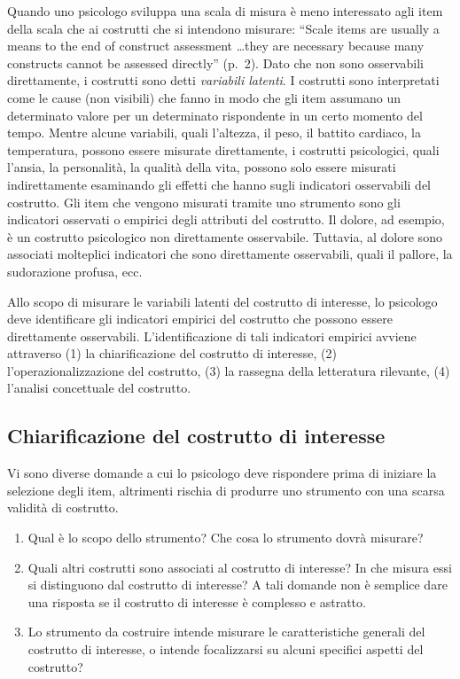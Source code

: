 \documentclass[
  11pt,
]{krantz}
\providecommand{\tightlist}{%
  \setlength{\itemsep}{0pt}\setlength{\parskip}{0pt}}
\theoremstyle{definition}
\theoremstyle{definition}
\theoremstyle{definition}
\theoremstyle{definition}
\theoremstyle{remark}
\begin{document}
Quando uno psicologo sviluppa una scala di misura è meno interessato agli item della scala che ai costrutti che si intendono misurare: ``Scale items are usually a means to the end of construct assessment \ldots they are necessary because many constructs cannot be assessed directly'' (p.~2). Dato che non sono osservabili direttamente, i costrutti sono detti \emph{variabili latenti}. I costrutti sono interpretati come le cause (non visibili) che fanno in modo che gli item assumano un determinato valore per un determinato rispondente in un certo momento del tempo. Mentre alcune variabili, quali l'altezza, il peso, il battito cardiaco, la temperatura, possono essere misurate direttamente, i costrutti psicologici, quali l'ansia, la personalità, la qualità della vita, possono solo essere misurati indirettamente esaminando gli effetti che hanno sugli indicatori osservabili del costrutto. Gli item che vengono misurati tramite uno strumento sono gli indicatori osservati o empirici degli attributi del costrutto. Il dolore, ad esempio, è un costrutto psicologico non direttamente osservabile. Tuttavia, al dolore sono associati molteplici indicatori che sono direttamente osservabili, quali il pallore, la sudorazione profusa, ecc.

Allo scopo di misurare le variabili latenti del costrutto di interesse, lo psicologo deve identificare gli indicatori empirici del costrutto che possono essere direttamente osservabili. L'identificazione di tali indicatori empirici avviene attraverso (1) la chiarificazione del costrutto di interesse, (2) l'operazionalizzazione del costrutto, (3) la rassegna della letteratura rilevante, (4) l'analisi concettuale del costrutto.

\hypertarget{chiarificazione-del-costrutto-di-interesse}{%
\subsection{Chiarificazione del costrutto di interesse}\label{chiarificazione-del-costrutto-di-interesse}}

Vi sono diverse domande a cui lo psicologo deve rispondere prima di iniziare la selezione degli item, altrimenti rischia di produrre uno strumento con una scarsa validità di costrutto.

\begin{enumerate}
\def\labelenumi{\arabic{enumi}.}
\tightlist
\item
  Qual è lo scopo dello strumento? Che cosa lo strumento dovrà misurare?
\item
  Quali altri costrutti sono associati al costrutto di interesse? In che misura essi si distinguono dal costrutto di interesse? A tali domande non è semplice dare una risposta se il costrutto di interesse è complesso e astratto.
\item
  Lo strumento da costruire intende misurare le caratteristiche generali del costrutto di interesse, o intende focalizzarsi su alcuni specifici aspetti del costrutto?
\end{enumerate}
\end{document}
